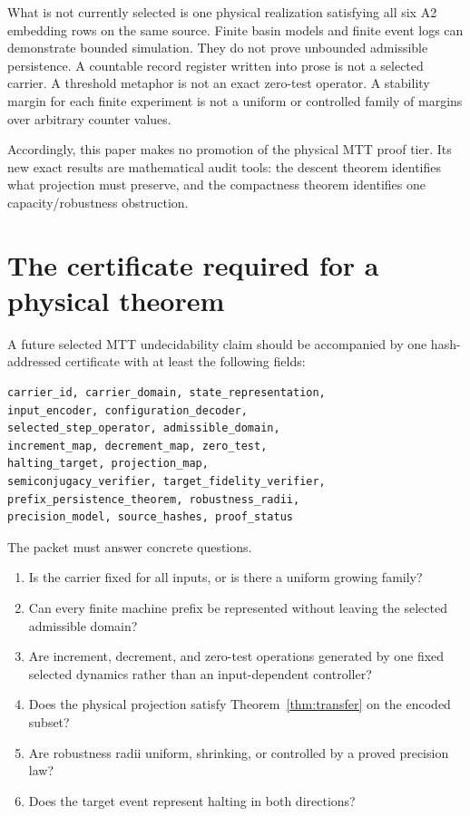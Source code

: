 \documentclass[11pt]{article}
\theoremstyle{definition}
\theoremstyle{remark}
\begin{document}
What is not currently selected is one physical realization satisfying all six
A2 embedding rows on the same source.  Finite basin models and finite event
logs can demonstrate bounded simulation.  They do not prove unbounded
admissible persistence.  A countable record register written into prose is not
a selected carrier.  A threshold metaphor is not an exact zero-test operator.
A stability margin for each finite experiment is not a uniform or controlled
family of margins over arbitrary counter values.

Accordingly, this paper makes no promotion of the physical MTT proof tier.  Its
new exact results are mathematical audit tools: the descent theorem identifies
what projection must preserve, and the compactness theorem identifies one
capacity/robustness obstruction.

\section{The certificate required for a physical theorem}

A future selected MTT undecidability claim should be accompanied by one
hash-addressed certificate with at least the following fields:
\begin{verbatim}
carrier_id, carrier_domain, state_representation,
input_encoder, configuration_decoder,
selected_step_operator, admissible_domain,
increment_map, decrement_map, zero_test,
halting_target, projection_map,
semiconjugacy_verifier, target_fidelity_verifier,
prefix_persistence_theorem, robustness_radii,
precision_model, source_hashes, proof_status
\end{verbatim}

The packet must answer concrete questions.
\begin{enumerate}[label=(R\arabic*)]
\item Is the carrier fixed for all inputs, or is there a uniform growing
family?
\item Can every finite machine prefix be represented without leaving the
selected admissible domain?
\item Are increment, decrement, and zero-test operations generated by one
fixed selected dynamics rather than an input-dependent controller?
\item Does the physical projection satisfy Theorem~\ref{thm:transfer} on the
encoded subset?
\item Are robustness radii uniform, shrinking, or controlled by a proved
precision law?
\item Does the target event represent halting in both directions?
\end{enumerate}
\end{document}
